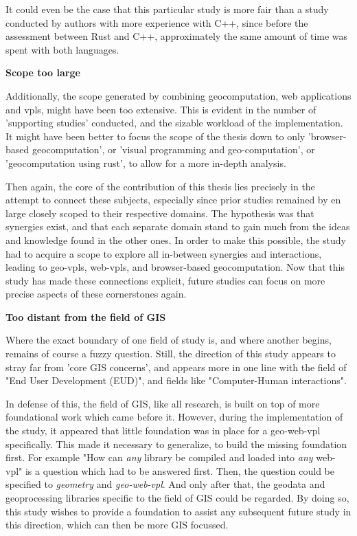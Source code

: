 It could even be the case that this particular study is more fair than a study conducted by authors with more experience with C++, 
since before the assessment between Rust and C++, approximately the same amount of time was spent with both languages. 

\textbf{Scope too large}

Additionally, the scope generated by combining geocomputation, web applications and vpls, might have been too extensive. 
This is evident in the number of 'supporting studies' conducted, and the sizable workload of the implementation.
It might have been better to focus the scope of the thesis down to only 'browser-based geocomputation', or 'visual programming and geo-computation', or 'geocomputation using rust', to allow for a more in-depth analysis.

Then again, the core of the contribution of this thesis lies precisely in the attempt to connect these subjects,
especially since prior studies remained by en large closely scoped to their respective domains.
The hypothesis was that synergies exist, and that each separate domain stand to gain much from the ideas and knowledge found in the other ones. 
In order to make this possible, the study had to acquire a scope to explore all in-between synergies and interactions, leading to geo-vpls, web-vpls, and browser-based geocomputation. 
Now that this study has made these connections explicit, future studies can focus on more precise aspects of these cornerstones again.

\textbf{Too distant from the field of GIS}

Where the exact boundary of one field of study is, and where another begins, remains of course a fuzzy question. 
Still, the direction of this study appears to stray far from 'core GIS concerns', and appears more in one line with the  field of "End User Development (EUD)", and fields like "Computer-Human interactions". 

In defense of this, the field of GIS, like all research, is built on top of more foundational work which came before it. 
However, during the implementation of the study, it appeared that little foundation was in place for a geo-web-vpl specifically. 
This made it necessary to generalize, to build the missing foundation first.
For example "How can \emph{any} library be compiled and loaded into \emph{any} web-vpl" is a question which had to be answered first. 
Then, the question could be specified to \emph{geometry} and \emph{geo-web-vpl}. 
And only after that, the geodata and geoprocessing libraries specific to the field of GIS could be regarded. 
By doing so, this study wishes to provide a foundation to assist any subsequent future study in this direction, which can then be more GIS focussed.

